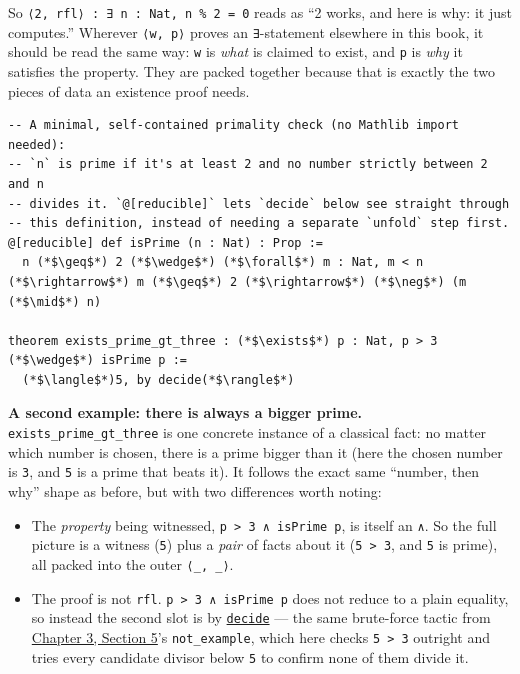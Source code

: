 So \texttt{⟨2, rfl⟩ : ∃ n : Nat, n \% 2 = 0} reads as ``2 works, and here is why: it just computes.'' Wherever \texttt{⟨w, p⟩} proves an \texttt{∃}-statement elsewhere in this book, it should be read the same way: \texttt{w} is \emph{what} is claimed to exist, and \texttt{p} is \emph{why} it satisfies the property. They are packed together because that is exactly the two pieces of data an existence proof needs.

\begin{lstlisting}
-- A minimal, self-contained primality check (no Mathlib import needed):
-- `n` is prime if it's at least 2 and no number strictly between 2 and n
-- divides it. `@[reducible]` lets `decide` below see straight through
-- this definition, instead of needing a separate `unfold` step first.
@[reducible] def isPrime (n : Nat) : Prop :=
  n (*$\geq$*) 2 (*$\wedge$*) (*$\forall$*) m : Nat, m < n (*$\rightarrow$*) m (*$\geq$*) 2 (*$\rightarrow$*) (*$\neg$*) (m (*$\mid$*) n)

theorem exists_prime_gt_three : (*$\exists$*) p : Nat, p > 3 (*$\wedge$*) isPrime p :=
  (*$\langle$*)5, by decide(*$\rangle$*)
\end{lstlisting}

\textbf{A second example: there is always a bigger prime.} \texttt{exists\_\allowbreak{}prime\_\allowbreak{}gt\_\allowbreak{}three} is one concrete instance of a classical fact: no matter which number is chosen, there is a prime bigger than it (here the chosen number is \texttt{3}, and \texttt{5} is a prime that beats it). It follows the exact same ``number, then why'' shape as before, but with two differences worth noting:

\begin{itemize}
\tightlist
\item
  The \emph{property} being witnessed, \texttt{p > 3 ∧ isPrime p}, is itself an \texttt{∧}. So the full picture is a witness (\texttt{5}) plus a \emph{pair} of facts about it (\texttt{5 > 3}, and \texttt{5} is prime), all packed into the outer \texttt{⟨\_\allowbreak{}, \_\allowbreak{}⟩}.
\item
  The proof is not \texttt{rfl}. \texttt{p > 3 ∧ isPrime p} does not reduce to a plain equality, so instead the second slot is by \href{https://lean-lang.org/doc/reference/latest/Tactic-Proofs/Tactic-Reference/}{\texttt{decide}} --- the same brute-force tactic from \hyperref[sec:03-propositions-and-proofs:05-and-or-not:1]{Chapter 3, Section 5}'s \texttt{not\_\allowbreak{}example}, which here checks \texttt{5 > 3} outright and tries every candidate divisor below \texttt{5} to confirm none of them divide it.
\end{itemize}

